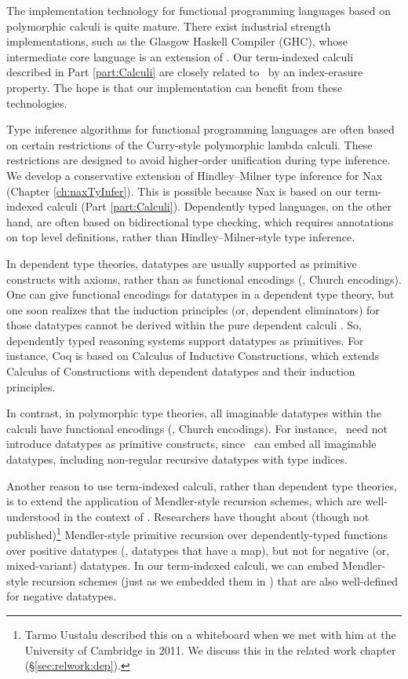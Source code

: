 The implementation technology for functional programming languages based on
polymorphic calculi is quite mature. There exist industrial
strength implementations, such as the Glasgow Haskell Compiler (GHC),
whose intermediate core language is an extension of \Fw.
Our term-indexed calculi described in Part \ref{part:Calculi} are closely
related to \Fw\ by an index-erasure property. The hope is that
our implementation can benefit from these technologies.

Type inference algorithms for functional programming languages are often
based on certain restrictions of the Curry-style polymorphic lambda calculi.
These restrictions are designed to avoid higher-order unification during
type inference.
We develop a conservative extension of Hindley--Milner type inference for
Nax (Chapter \ref{ch:naxTyInfer}). This is possible because Nax is based on our
term-indexed calculi (Part \ref{part:Calculi}). Dependently typed languages,
on the other hand, are often based on bidirectional type checking, which
requires annotations on top level definitions, rather than
Hindley--Milner-style type inference.

In dependent type theories, datatypes are usually supported as primitive
constructs with axioms, rather than as functional encodings
(\eg, Church encodings). One can give functional encodings for datatypes
in a dependent type theory, but one soon realizes that the induction principles
(or, dependent eliminators) for those datatypes cannot be derived within
the pure dependent calculi \cite{Geuvers01}.
So, dependently typed reasoning systems support datatypes as primitives.
For instance, Coq is based on Calculus of Inductive Constructions, which
extends Calculus of Constructions \cite{CoqHue86} with dependent datatypes
and their induction principles.

In contrast, in polymorphic type theories, all imaginable datatypes
within the calculi have functional encodings (\eg, Church encodings).
For instance, \Fw\ need not introduce datatypes as primitive constructs,
since \Fw\ can embed all imaginable datatypes, including non-regular
recursive datatypes with type indices. 

Another reason to use term-indexed calculi, rather than dependent type theories,
is to extend the application of Mendler-style recursion schemes,
which are well-understood in the context of \Fw.
Researchers have thought about (though not published)\footnote{
     Tarmo Uustalu described this on a whiteboard
     when we met with him at the University of Cambridge in 2011.
     We discuss this in the related work chapter (\S\ref{sec:relwork:dep}).}
Mendler-style primitive recursion over dependently-typed functions
over positive datatypes (\ie, datatypes that have a map), but not for
negative (or, mixed-variant) datatypes. In our term-indexed calculi,
we can embed Mendler-style recursion schemes (just as we embedded them in \Fw)
that are also well-defined for negative datatypes.

